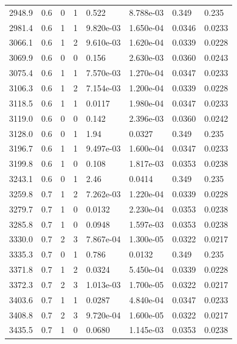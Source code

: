 \documentclass[preview]{standalone}
\begin{document}
{{{\begin{tabular}{L{1.2cm}C{1.2cm} C{0.3cm}C{0.5cm} C{1.4cm}C{1.4cm} C{1.4cm}C{1.4cm}}
  2948.9  &   0.6  & 0     &  1 &  0.522  & 8.788e-03  & 0.349 &  0.235   \\ 
  2981.4  &   0.6  & 1     &  1 &  9.820e-03  & 1.650e-04  & 0.0346 &  0.0233   \\ 
  3066.1  &   0.6  & 1     &  2 &  9.610e-03  & 1.620e-04  & 0.0339 &  0.0228   \\ 
  3069.9  &   0.6  & 0     &  0 &  0.156  & 2.630e-03  & 0.0360 &  0.0243   \\ 
  3075.4  &   0.6  & 1     &  1 &  7.570e-03  & 1.270e-04  & 0.0347 &  0.0233   \\ 
  3106.3  &   0.6  & 1     &  2 &  7.154e-03  & 1.200e-04  & 0.0339 &  0.0228   \\ 
  3118.5  &   0.6  & 1     &  1 &  0.0117  & 1.980e-04  & 0.0347 &  0.0233   \\ 
  3119.0  &   0.6  & 0     &  0 &  0.142  & 2.396e-03  & 0.0360 &  0.0242   \\ 
  3128.0  &   0.6  & 0     &  1 &  1.94  & 0.0327  & 0.349 &  0.235   \\ 
  3196.7  &   0.6  & 1     &  1 &  9.497e-03  & 1.600e-04  & 0.0347 &  0.0233   \\ 
  3199.8  &   0.6  & 1     &  0 &  0.108  & 1.817e-03  & 0.0353 &  0.0238   \\ 
  3243.1  &   0.6  & 0     &  1 &  2.46  & 0.0414  & 0.349 &  0.235   \\ 
  3259.8  &   0.7  & 1     &  2 &  7.262e-03  & 1.220e-04  & 0.0339 &  0.0228   \\ 
  3279.7  &   0.7  & 1     &  0 &  0.0132  & 2.230e-04  & 0.0353 &  0.0238   \\ 
  3285.8  &   0.7  & 1     &  0 &  0.0948  & 1.597e-03  & 0.0353 &  0.0238   \\ 
  3330.0  &   0.7  & 2     &  3 &  7.867e-04  & 1.300e-05  & 0.0322 &  0.0217   \\ 
  3335.3  &   0.7  & 0     &  1 &  0.786  & 0.0132  & 0.349 &  0.235   \\ 
  3371.8  &   0.7  & 1     &  2 &  0.0324  & 5.450e-04  & 0.0339 &  0.0228   \\ 
  3372.3  &   0.7  & 2     &  3 &  1.013e-03  & 1.700e-05  & 0.0322 &  0.0217   \\ 
  3403.6  &   0.7  & 1     &  1 &  0.0287  & 4.840e-04  & 0.0347 &  0.0233   \\ 
  3408.8  &   0.7  & 2     &  3 &  9.720e-04  & 1.600e-05  & 0.0322 &  0.0217   \\ 
  3435.5  &   0.7  & 1     &  0 &  0.0680  & 1.145e-03  & 0.0353 &  0.0238   \\ 

\end{tabular}}}}
\end{document}

